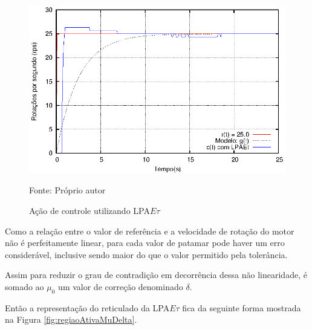 \begin{figure}[!htb]%
\caption{Ação de controle utilizando LPA$E\tau$}
\vspace{-1cm}\center\includegraphics[scale=1.6]{./imagens/LPAEt-gct100.eps}
\label{fig:acaoLPAEtgct100}

{\small Fonte: Próprio autor}
\end{figure}





Como a relação entre o valor de referência e a 
velocidade de rotação do motor não é perfeitamente linear,
para cada valor de patamar pode haver um erro considerável,
inclusive sendo maior do que o valor permitido pela 
tolerância. 

Assim para reduzir o grau de contradição
em decorrência dessa não linearidade, 
é somado ao $\mu_0$ um valor de correção denominado $\delta$.

Então a representação do reticulado da LPA$E\tau$ 
fica da seguinte forma mostrada na 
Figura \ref{fig:regiaoAtivaMuDelta}. 





